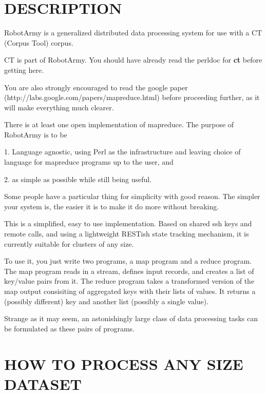 \documentclass{tufte-handout}
\begin{document}
\section{DESCRIPTION\label{DESCRIPTION}}


RobotArmy is a generalized distributed data processing system for use with a CT (Corpus Tool) corpus.



CT is part of RobotArmy. You should have already read the perldoc for \textbf{ct} before getting here.



You are also strongly encouraged to read the google paper (http://labs.google.com/papers/mapreduce.html) before proceeding further, as it will make everything much clearer.



There is at least one open implementation of mapreduce. The purpose of RobotArmy is to be



1. Language agnostic, using Perl as the infrastructure and leaving choice of language for mapreduce programs up to the user, and



2. as simple as possible while still being useful.



Some people have a particular thing for simplicity with good reason. The
simpler your system is, the easier it is to make it do more without breaking.



This is a simplified, easy to use implementation. Based on shared ssh keys and remote calls, and using a lightweight RESTish state tracking mechanism, it is currently suitable for clusters of any size.



To use it, you just write two programs, a map program and a reduce program. The map program reads in a stream, defines input records, and creates a list of key/value pairs from it. The reduce program takes a transformed version of the map output consisiting of aggregated keys with their lists of values. It returns a (possibly different) key and another list (possibly a single value).



Strange as it may seem, an astonishingly large class of data processing tasks can be formulated as these pairs of programs.

\section{HOW TO PROCESS ANY SIZE DATASET\label{HOW_TO_PROCESS_ANY_SIZE_DATASET}}
\end{document}
